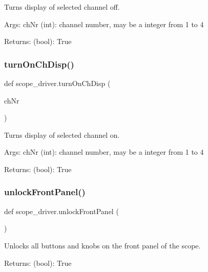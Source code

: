 \begin{DoxyVerb}Turns display of selected channel off.

Args:
    chNr (int): channel number, may be a integer from 1 to 4

Returns:
    (bool): True
\end{DoxyVerb}
 \mbox{\label{namespacescope__driver_a2c16a205b8401242d27d1a6862fc12b5}} 
\subsubsection{\texorpdfstring{turn\+On\+Ch\+Disp()}{turnOnChDisp()}}
{\footnotesize\ttfamily def scope\+\_\+driver.\+turn\+On\+Ch\+Disp (\begin{DoxyParamCaption}\item[{}]{ch\+Nr }\end{DoxyParamCaption})}

\begin{DoxyVerb}Turns display of selected channel on.

Args:
    chNr (int): channel number, may be a integer from 1 to 4

Returns:
    (bool): True
\end{DoxyVerb}
 \mbox{\label{namespacescope__driver_ab4b00f96eda8159476a551ec43ff95df}} 
\subsubsection{\texorpdfstring{unlock\+Front\+Panel()}{unlockFrontPanel()}}
{\footnotesize\ttfamily def scope\+\_\+driver.\+unlock\+Front\+Panel (\begin{DoxyParamCaption}{ }\end{DoxyParamCaption})}

\begin{DoxyVerb}Unlocks all buttons and knobs on the front panel of the scope.

Returns:
    (bool): True
\end{DoxyVerb}
 